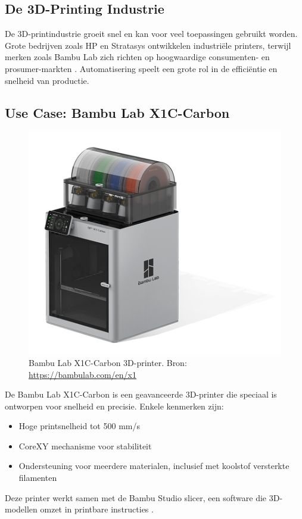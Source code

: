 \newpage
\subsection{De 3D-Printing Industrie}
De 3D-printindustrie groeit snel en kan voor veel toepassingen gebruikt worden. Grote bedrijven zoals HP en Stratasys ontwikkelen industriële printers, terwijl merken zoals Bambu Lab zich richten op hoogwaardige consumenten- en prosumer-markten \autocite{3dPrintingIndustry}. Automatisering speelt een grote rol in de efficiëntie en snelheid van productie.

\subsection{Use Case: Bambu Lab X1C-Carbon}
\begin{figure} %
    \centering
    \includegraphics[width=0.8\linewidth]{Foto's/X1C}
    \caption{Bambu Lab X1C-Carbon 3D-printer. Bron: \url{https://bambulab.com/en/x1}}
    \label{fig:x1c}
\end{figure}
De Bambu Lab X1C-Carbon is een geavanceerde 3D-printer die speciaal is ontworpen voor snelheid en precisie. Enkele kenmerken zijn:
\begin{itemize}
    \item Hoge printsnelheid tot 500 mm/s
    \item CoreXY mechanisme voor stabiliteit
    \item Ondersteuning voor meerdere materialen, inclusief met koolstof versterkte filamenten
\end{itemize}
Deze printer werkt samen met de Bambu Studio slicer, een software die 3D-modellen omzet in printbare instructies \autocite{bambulabX1Carbon}.



